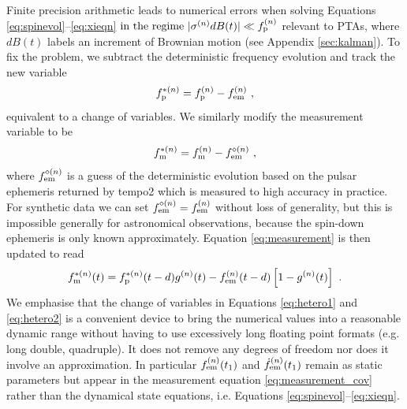 \documentclass[fleqn,usenatbib,useAMS]{mnras}
\begin{document}
Finite precision arithmetic leads to numerical errors when solving Equations \eqref{eq:spinevol}--\eqref{eq:xieqn} $ \text{in  the regime } |\sigma^{(n)} dB(t) | \ll f_{\rm p}^{(n)}$ relevant to PTAs, where $dB(t)$ labels an increment of Brownian motion (see Appendix \ref{sec:kalman}). To fix the problem, we subtract the deterministic frequency evolution and track the new variable
\begin{equation}
	f_{\rm p}^{* (n)} = f_{\rm p}^{(n)} - f_{\rm em}^{(n)} \ , \label{eq:hetero1}
\end{equation}  
equivalent to a change of variables. We similarly modify the measurement variable to be
\begin{equation}
	f_{\rm m}^{* (n)} = f_{\rm m}^{(n)} - f_{\rm em}^{\diamond (n)} \ , \label{eq:hetero2}
\end{equation}
where $ f_{\rm em}^{\diamond (n)}$ is a guess of the deterministic evolution based on the pulsar ephemeris returned by {\sc tempo2}  which is measured to high accuracy in practice. For synthetic data we can set $ f_{\rm em}^{\diamond (n)} = f_{\rm em}^{(n)}$ without loss of generality, but this is impossible generally for astronomical observations, because the spin-down ephemeris is only known approximately. Equation \eqref{eq:measurement} is then updated to read 
\begin{equation}
	f_{\rm m}^{* (n)}(t) = f_{\rm p}^{* (n)}(t-d) g^{(n)}(t) -  f_{\rm em}^{(n)}(t-d)\left[ 1-g^{(n)}(t)\right] \ .
	\label{eq:measurement_cov}
\end{equation}
We emphasise that the change of variables in Equations \eqref{eq:hetero1} and \eqref{eq:hetero2} is a convenient device to bring the numerical values into a reasonable dynamic range without having to use excessively long floating point formats (e.g. long double, quadruple). It does not remove any degrees of freedom nor does it involve an approximation. In particular $f_{\rm em}^{(n)}(t_1)$
and $\dot{f}_{\rm em}^{(n)}(t_1)$ remain as static parameters but appear in the measurement equation \eqref{eq:measurement_cov} rather than the dynamical state equations, i.e. Equations \eqref{eq:spinevol}--\eqref{eq:xieqn}.
\end{document}
